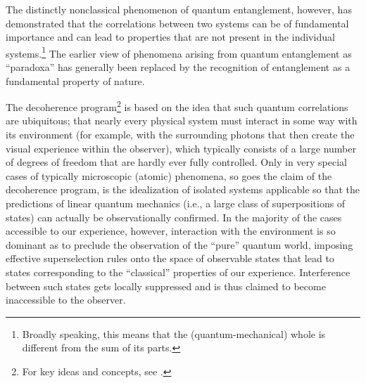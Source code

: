 \documentclass[twocolumn,rmp,aps,amsmath,amsfonts,noshowkeys,noshowpacs]{revtex4}
\begin{document}
The distinctly nonclassical phenomenon of quantum entanglement,
however, has demonstrated that the correlations between two systems
can be of fundamental importance and can lead to properties that are
not present in the individual systems.\footnote{Broadly speaking,
  this means that the (quantum-mechanical) whole is different
  from the sum of its parts.} The earlier view of phenomena arising
from quantum entanglement as ``paradoxa'' has generally been replaced
by the recognition of entanglement as a fundamental property of
nature.

The decoherence program\footnote{For key ideas and concepts, see
  \citet{Zeh:1970:yt,Kubler:1973:ux,Zeh:1973:wq,Zeh:1995:jg,%
Zeh:1996:gy,Zeh:1999:qr,Joos:1985:iu,Zurek:1981:dd,Zurek:1982:tv,%
Zurek:1991:vv,Zurek:1993:pu,Zurek:2002:ii,Joos:2003:jh}.}  is based on
the idea that such quantum correlations are ubiquitous; that nearly
every physical system must interact in some way with its environment
(for example, with the surrounding photons that then create the visual
experience within the observer), which typically consists of a large
number of degrees of freedom that are hardly ever fully controlled.
Only in very special cases of typically microscopic (atomic)
phenomena, so goes the claim of the decoherence program, is the
idealization of isolated systems applicable so that the predictions of
linear quantum mechanics (i.e., a large class of superpositions of
states) can actually be observationally confirmed. In the majority of
the cases accessible to our experience, however, interaction with the
environment is so dominant as to preclude the observation of the
``pure'' quantum world, imposing effective superselection rules
\citep{Wick:1952:pp,Wick:1970:iz,Galindo:1962:tl,Wightman:1995:ug,Cisnerosy:1998:kz,Giulini:2000:ry}
onto the space of observable states that lead to states corresponding
to the ``classical'' properties of our experience. Interference
between such states gets locally suppressed and is thus claimed to
become inaccessible to the observer.
\end{document}
